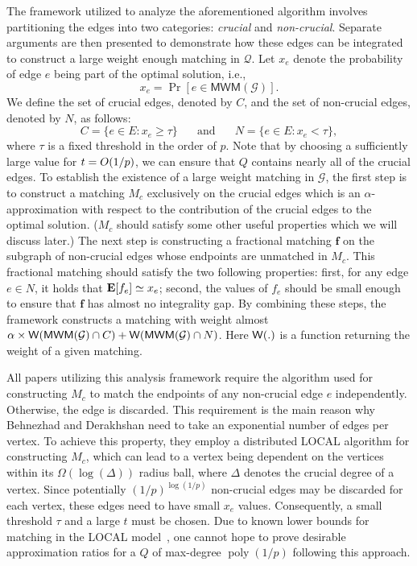 \documentclass[letterpaper,11pt]{article}
\DeclareMathOperator{\E}{\ensuremath{\normalfont \textbf{E}}}
\newcommand{\mc}[1]{\ensuremath{\mathcal{#1}}}
\newcommand{\MM}[0]{{\textsf{MWM}}}
\newcommand{\weight}[0]{{\sf{W}}}
\DeclareMathOperator{\poly}{poly}
\renewcommand{\O}[1]{\ensuremath{O\left(#1\right)}}
\let\originalleft\left
\let\originalright\right
\renewcommand{\left}{\mathopen{}\mathclose\bgroup\originalleft}
\renewcommand{\right}{\aftergroup\egroup\originalright}
\renewcommand{\mc}[1]{\ensuremath{\mathcal{#1}}}
\begin{document}
The framework utilized to analyze the aforementioned algorithm involves partitioning the edges into two categories: \textit{crucial} and \textit{non-crucial}. Separate arguments are then presented to demonstrate how these edges can be integrated to construct a large weight enough matching in $\mathcal{Q}$. Let $x_e$ denote the probability of edge $e$ being part of the optimal solution, i.e., 
\[ x_e = \Pr[e \in \MM(\mathcal{G})]. \]
We define the set of crucial edges, denoted by $C$, and the set of non-crucial edges, denoted by $N$, as follows:
\[ C = \{ e \in E : x_e \geq \tau \} \;\;\;\;\;\text{ and } \;\;\;\;\; N = \{ e \in E : x_e < \tau \},\]
where $\tau$ is a fixed threshold in the  order of $p$. Note that by choosing a sufficiently large value for $t=\O{1/p}$, we can ensure that $Q$ contains nearly all of the crucial edges. To establish the existence of a large weight matching in $\mc{G}$, the  first step  is to construct a matching $M_c$ exclusively on the crucial edges which is an $\alpha$-approximation  with respect to the contribution of  the crucial edges to the  optimal solution. ($M_c$ should  satisfy some other useful properties which we will discuss later.)  The next step is constructing a  fractional matching $\bm{f}$ on the subgraph of non-crucial edges whose endpoints are unmatched in $M_c$. This fractional matching should satisfy the two following properties: first, for any edge $e\in N$, it holds that $\E[f_e]\simeq x_e$; second, the values of $f_e$ should be small enough to ensure that $\bm{f}$ has almost no integrality gap.
By combining these steps, the framework constructs a matching with weight almost $\alpha\times \weight(\MM(\mathcal{G})\cap C)+ \weight(\MM(\mathcal{G})\cap N)$. Here $\weight(.)$ is a function returning the weight of a given matching.


All papers utilizing this analysis framework require the algorithm used for constructing $M_c$ to match the endpoints of any non-crucial edge $e$ independently. Otherwise, the edge is discarded. This requirement is the main reason why Behnezhad and Derakhshan  \cite{behnezhad2020stochastic} need to take an exponential number of edges per vertex. To achieve this property, they employ a distributed LOCAL algorithm for constructing $M_c$, which can lead to a vertex being dependent on the vertices within its $\Omega(\log(\Delta))$ radius ball, where $\Delta$ denotes the crucial degree of a vertex. Since potentially $(1/p)^{\log(1/p)}$ non-crucial edges may be discarded for each vertex, these edges need to have small $x_e$ values. Consequently, a small threshold $\tau$ and a large $t$ must be chosen.
Due to known lower bounds for matching in  the LOCAL model~\cite{kuhn2016local}, one  cannot hope to prove desirable approximation ratios for a $Q$ of max-degree $\poly(1/p)$ following this approach. 
\end{document}
